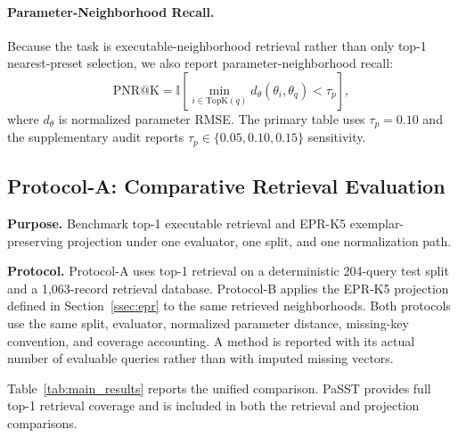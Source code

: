 \paragraph{Parameter-Neighborhood Recall.}
Because the task is executable-neighborhood retrieval rather than only top-1 nearest-preset selection, we also report parameter-neighborhood recall:
\begin{equation}
	\mathrm{PNR@K}=
	\mathbb{I}\left[\min_{i\in\mathrm{TopK}(q)}d_\theta(\theta_i,\theta_q)<\tau_p\right],
\end{equation}
where $d_\theta$ is normalized parameter RMSE. The primary table uses $\tau_p=0.10$ and the supplementary audit reports $\tau_p\in\{0.05,0.10,0.15\}$ sensitivity.

\subsection{Protocol-A: Comparative Retrieval Evaluation}
\label{ssec:protocolA}

\textbf{Purpose.} Benchmark top-1 executable retrieval and EPR-K5 exemplar-preserving projection under one evaluator, one split, and one normalization path.

\textbf{Protocol.} Protocol-A uses top-1 retrieval on a deterministic 204-query test split and a 1,063-record retrieval database. Protocol-B applies the EPR-K5 projection defined in Section~\ref{ssec:epr} to the same retrieved neighborhoods. Both protocols use the same split, evaluator, normalized parameter distance, missing-key convention, and coverage accounting. A method is reported with its actual number of evaluable queries rather than with imputed missing vectors.

Table~\ref{tab:main_results} reports the unified comparison. PaSST provides full top-1 retrieval coverage and is included in both the retrieval and projection comparisons.


